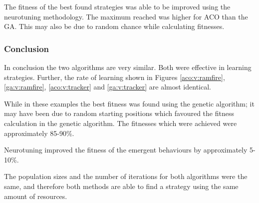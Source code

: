 The fitness of the best found strategies was able to be improved using the neurotuning methodology. The maximum reached was higher for ACO than the GA. This may also be due to random chance while calculating fitnesses.

\FigStrategyTune

\subsubsection{Conclusion}
In conclusion the two algorithms are very similar. Both were effective in learning strategies. Further, the rate of learning shown in Figures \ref{aco:v:ramfire}, \ref{ga:v:ramfire}, \ref{aco:v:tracker} and \ref{ga:v:tracker} are almost identical.

While in these examples the best fitness was found using the genetic algorithm; it may have been due to random starting positions which favoured the fitness calculation in the genetic algorithm. The fitnesses which were achieved were approximately 85-90\%.

Neurotuning improved the fitness of the emergent behaviours by approximately 5-10\%.

The population sizes and the number of iterations for both algorithms were the same, and therefore both methods are able to find a strategy using the same amount of resources.
